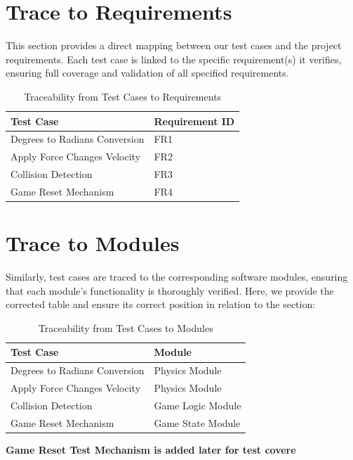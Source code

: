 \documentclass[12pt]{article}
\begin{document}
\FloatBarrier
\section{Trace to Requirements}
This section provides a direct mapping between our test cases and the project requirements. Each test case is linked to the specific requirement(s) it verifies, ensuring full coverage and validation of all specified requirements.

\begin{table}[h!]
\centering
\begin{tabular}{|l|l|}
\hline
\textbf{Test Case} & \textbf{Requirement ID} \\
\hline
Degrees to Radians Conversion & FR1 \\
Apply Force Changes Velocity & FR2 \\
Collision Detection & FR3 \\
Game Reset Mechanism & FR4 \\
\hline
\end{tabular}
\caption{Traceability from Test Cases to Requirements}
\label{tab:trace_to_requirements}
\end{table}

\FloatBarrier %

\section{Trace to Modules}
Similarly, test cases are traced to the corresponding software modules, ensuring that each module's functionality is thoroughly verified. Here, we provide the corrected table and ensure its correct position in relation to the section:

\begin{table}[h!]
\centering
\begin{tabular}{|l|l|}
\hline
\textbf{Test Case} & \textbf{Module} \\
\hline
Degrees to Radians Conversion & Physics Module \\
Apply Force Changes Velocity & Physics Module \\
Collision Detection & Game Logic Module \\
Game Reset Mechanism & Game State Module \\
\hline
\end{tabular}

\textbf{Game Reset Test Mechanism is added later for test covere} \\
\caption{Traceability from Test Cases to Modules}
\label{tab:trace_to_modules}
\end{table}
\end{document}
